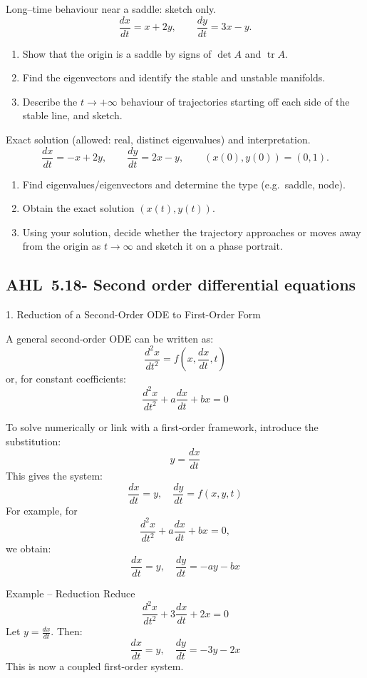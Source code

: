 \documentclass[11pt]{article}
\def\textbf#1{#1}%
\newcommand{\tocsubsection}[1]{\subsection{#1}}
\newcounter{question}
\begin{document}
\begin{question}
\textbf{Long–time behaviour near a saddle: sketch only.}
\[
\frac{dx}{dt}=x+2y,\qquad \frac{dy}{dt}=3x-y.
\]
\begin{enumerate}
  \item Show that the origin is a saddle by signs of $\det A$ and $\operatorname{tr}A$.
  \item Find the eigenvectors and identify the stable and unstable manifolds.
  \item Describe the $t\to+\infty$ behaviour of trajectories starting off each side of the stable line, and sketch.
\end{enumerate}
\end{question}

\begin{question}
\textbf{Exact solution (allowed: real, distinct eigenvalues) and interpretation.}
\[
\frac{dx}{dt}=-x+2y,\qquad \frac{dy}{dt}=2x-y,\qquad (x(0),y(0))=(0,1).
\]
\begin{enumerate}
  \item Find eigenvalues/eigenvectors and determine the type (e.g.\ saddle, node).
  \item Obtain the exact solution $(x(t),y(t))$.
  \item Using your solution, decide whether the trajectory approaches or moves away from the origin as $t\to\infty$ and sketch it on a phase portrait.
\end{enumerate}
\end{question}




\tocsubsection{AHL 5.18- Second order differential equations}

1. Reduction of a Second-Order ODE to First-Order Form

A general second-order ODE can be written as:
\[
\frac{d^2x}{dt^2} = f\left(x, \frac{dx}{dt}, t\right)
\]
or, for constant coefficients:
\[
\frac{d^2x}{dt^2} + a\frac{dx}{dt} + bx = 0
\]

To solve numerically or link with a first-order framework, introduce the substitution:
\[
y = \frac{dx}{dt}
\]
This gives the system:
\[
\frac{dx}{dt} = y, \quad \frac{dy}{dt} = f(x, y, t)
\]
For example, for
\[
\frac{d^2x}{dt^2} + a\frac{dx}{dt} + bx = 0,
\]
we obtain:
\[
\frac{dx}{dt} = y, \quad \frac{dy}{dt} = -a y - b x
\]

Example – Reduction
Reduce
\[
\frac{d^2x}{dt^2} + 3\frac{dx}{dt} + 2x = 0
\]
Let \(y = \frac{dx}{dt}\). Then:
\[
\frac{dx}{dt} = y, \quad \frac{dy}{dt} = -3y - 2x
\]
This is now a coupled first-order system.
\end{document}
